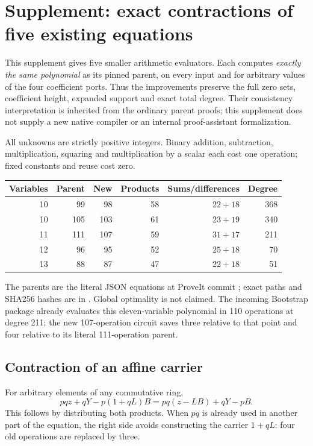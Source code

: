 \section{Supplement: exact contractions of five existing equations}

This supplement gives five smaller arithmetic evaluators. Each computes
\emph{exactly the same polynomial} as its pinned parent, on every input and
for arbitrary values of the four coefficient ports. Thus the improvements
preserve the full zero sets, coefficient height, expanded support and exact
total degree. Their consistency interpretation is inherited from the
ordinary parent proofs; this supplement does not supply a new native
compiler or an internal proof-assistant formalization.

All unknowns are strictly positive integers. Binary addition, subtraction,
multiplication, squaring and multiplication by a scalar each cost one
operation; fixed constants and reuse cost zero.
\begin{center}\small
\begin{tabular}{rrrrrr}
Variables & Parent & New & Products & Sums/differences & Degree\\\hline
10 & 99 & 98 & 58 & $22+18$ & 368\\
10 & 105 & 103 & 61 & $23+19$ & 340\\
11 & 111 & 107 & 59 & $31+17$ & 211\\
12 & 96 & 95 & 52 & $25+18$ & 70\\
13 & 88 & 87 & 47 & $22+18$ & 51
\end{tabular}
\end{center}
The parents are the literal JSON equations at ProveIt commit
; exact paths and SHA256
hashes are in . Global optimality is not claimed.
The incoming Bootstrap package already evaluates this eleven-variable
polynomial in 110 operations at degree 211; the new 107-operation circuit
saves three relative to that point and four relative to its literal
111-operation parent.

\subsection{Contraction of an affine carrier}
For arbitrary elements of any commutative ring,
\begin{equation}
 pqz+qY-p(1+qL)B=pq(z-LB)+qY-pB.
 \label{eq:supp-affine}
\end{equation}
This follows by distributing both products. When $pq$ is already used in
another part of the equation, the right side avoids constructing the
carrier $1+qL$: four old operations are replaced by three.

